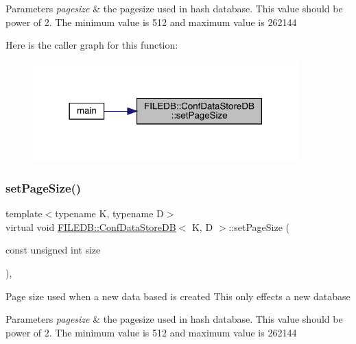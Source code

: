 \begin{DoxyParams}{Parameters}
{\em pagesize} & the pagesize used in hash database. This value should be power of 2. The minimum value is 512 and maximum value is 262144 \\
\hline
\end{DoxyParams}
Here is the caller graph for this function\+:
\nopagebreak
\begin{figure}[H]
\begin{center}
\leavevmode
\includegraphics[width=290pt]{d8/d19/classFILEDB_1_1ConfDataStoreDB_a50004cb93881959d0846a12d920a95c8_icgraph}
\end{center}
\end{figure}
\mbox{\label{classFILEDB_1_1ConfDataStoreDB_a50004cb93881959d0846a12d920a95c8}} 
\subsubsection{\texorpdfstring{setPageSize()}{setPageSize()}\hspace{0.1cm}{\footnotesize\ttfamily [2/3]}}
{\footnotesize\ttfamily template$<$typename K, typename D$>$ \\
virtual void \mbox{\hyperlink{classFILEDB_1_1ConfDataStoreDB}{F\+I\+L\+E\+D\+B\+::\+Conf\+Data\+Store\+DB}}$<$ K, D $>$\+::set\+Page\+Size (\begin{DoxyParamCaption}\item[{const unsigned int}]{size }\end{DoxyParamCaption})\hspace{0.3cm}{\ttfamily [inline]}, {\ttfamily [virtual]}}

Page size used when a new data based is created This only effects a new database


\begin{DoxyParams}{Parameters}
{\em pagesize} & the pagesize used in hash database. This value should be power of 2. The minimum value is 512 and maximum value is 262144 \\
\hline
\end{DoxyParams}
\mbox{\label{classFILEDB_1_1ConfDataStoreDB_a50004cb93881959d0846a12d920a95c8}} 
